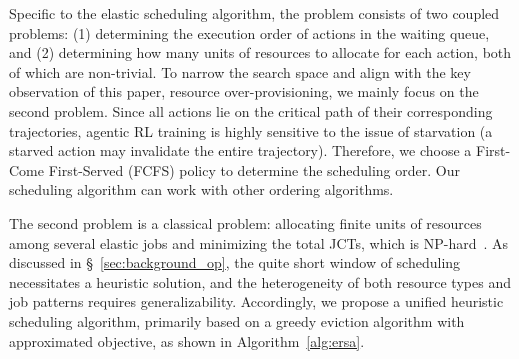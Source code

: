 Specific to the elastic scheduling algorithm, the problem consists of two coupled problems: (1) determining the execution order of actions in the waiting queue, and (2) determining how many units of resources to allocate for each action, both of which are non-trivial. 
To narrow the search space and align with the key observation of this paper, resource over-provisioning, we mainly focus on the second problem. %
Since all actions lie on the critical path of their corresponding trajectories, agentic RL training is highly sensitive to the issue of starvation (a starved action may invalidate the entire trajectory). Therefore, we choose a First-Come First-Served (FCFS) policy to determine the scheduling order.
Our scheduling algorithm can work with other ordering algorithms.

The second problem is a classical problem: allocating finite units of resources among several elastic jobs and minimizing the total JCTs, which is NP-hard~\citep{bruno1974scheduling}. As discussed in \S~\ref{sec:background_op}, the quite short window of scheduling necessitates a heuristic solution, and the heterogeneity of both resource types and job patterns requires generalizability. Accordingly, we propose a unified heuristic scheduling algorithm, primarily based on a greedy eviction algorithm with approximated objective, as shown in Algorithm~\ref{alg:ersa}.


